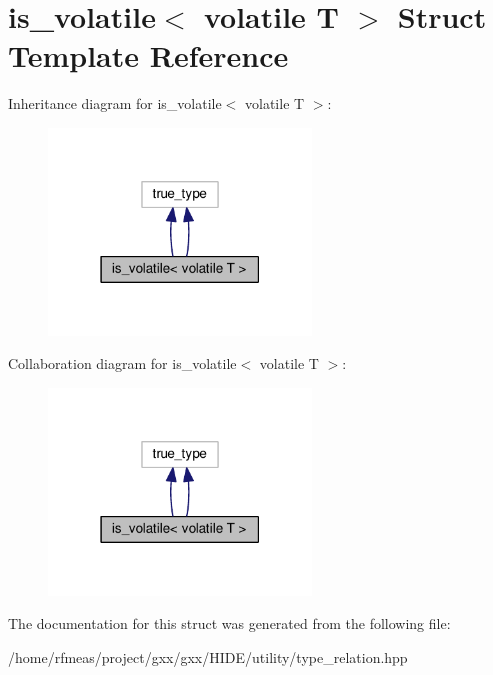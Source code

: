 \hypertarget{structis__volatile_3_01volatile_01T_01_4}{}\section{is\+\_\+volatile$<$ volatile T $>$ Struct Template Reference}
\label{structis__volatile_3_01volatile_01T_01_4}


Inheritance diagram for is\+\_\+volatile$<$ volatile T $>$\+:
\nopagebreak
\begin{figure}[H]
\begin{center}
\leavevmode
\includegraphics[width=198pt]{structis__volatile_3_01volatile_01T_01_4__inherit__graph}
\end{center}
\end{figure}


Collaboration diagram for is\+\_\+volatile$<$ volatile T $>$\+:
\nopagebreak
\begin{figure}[H]
\begin{center}
\leavevmode
\includegraphics[width=198pt]{structis__volatile_3_01volatile_01T_01_4__coll__graph}
\end{center}
\end{figure}


The documentation for this struct was generated from the following file\+:\begin{DoxyCompactItemize}
\item 
/home/rfmeas/project/gxx/gxx/\+H\+I\+D\+E/utility/type\+\_\+relation.\+hpp\end{DoxyCompactItemize}
